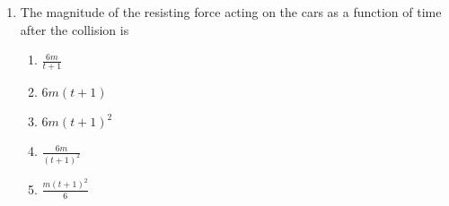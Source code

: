 \documentclass{../../oss-apphys}
\begin{document}
\begin{multicols}{2}
\begin{enumerate}[resume,leftmargin=18pt]
  \item The magnitude of the resisting force acting on the cars as a function of
    time after the collision is
    \label{remote2}
    \begin{enumerate}[noitemsep,topsep=0pt,leftmargin=18pt,label=(\Alph*)]
    \item $\displaystyle \frac{6m}{t+1}$
    \item $6m(t+1)$
    \item $6m(t+1)^2$
    \item $\displaystyle\frac{6m}{(t+1)^2}$
    \item $\displaystyle\frac{m(t+1)^2}{6}$
    \end{enumerate}
    
    \columnbreak
    

\end{enumerate}
\end{multicols}
\end{document}
